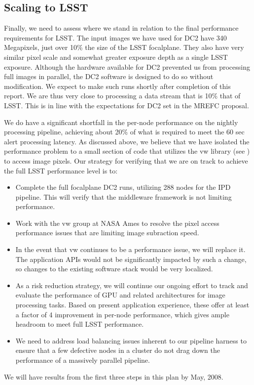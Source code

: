 \subsection{Scaling to LSST}

Finally, we need to assess where we stand in relation to the final
performance requirements for LSST.  The input images we have used for
DC2 have 340 Megapixels, just over 10\% the size of the LSST
focalplane.  They also have very similar pixel scale and somewhat
greater exposure depth as a single LSST exposure.  Although the
hardware available for DC2 prevented us from processing full images in
parallel, the DC2 software is designed to do so without modification.
We expect to make such runs shortly after completion of this report.
We are thus very close to processing a data stream that is 10\% that
of LSST.  This is in line with the expectations for DC2 set in the
MREFC proposal.

We do have a significant shortfall in the per-node performance on the
nightly processing pipeline, achieving about 20\% of what is required
to meet the 60 sec alert processing latency.  As discussed above, we
believe that we have isolated the performance problem to a small
section of code that utilizes the vw library (see ) to access image
pixels. Our strategy for verifying that we are on track to achieve the full LSST
performance level is to:

\begin{itemize}
\item Complete the full focalplane DC2 runs, utilizing 288 nodes for
  the IPD pipeline.  This will verify that the middleware framework is
  not limiting performance.
\item Work with the vw group at NASA Ames to resolve the pixel access
  performance issues that are limiting image subraction speed.
\item In the event that vw continues to be a performance issue, we
  will replace it.  The application APIs would not be significantly
  impacted by such a change, so changes to the existing software stack
  would be very localized.
\item As a risk reduction strategy, we will continue our ongoing
  effort to track and evaluate the performance of GPU and related
  architectures for image processing tasks.  Based on present
  application experience, these offer at least a factor of 4
  improvement in per-node performance, which gives ample headroom to
  meet full LSST performance.
\item We need to address load balancing issues inherent to our
  pipeline harness to ensure that a few defective nodes in a cluster
  do not drag down the performance of a massively parallel pipeline.  
\end{itemize}

We will have results from the first three steps in this plan by May, 2008.

